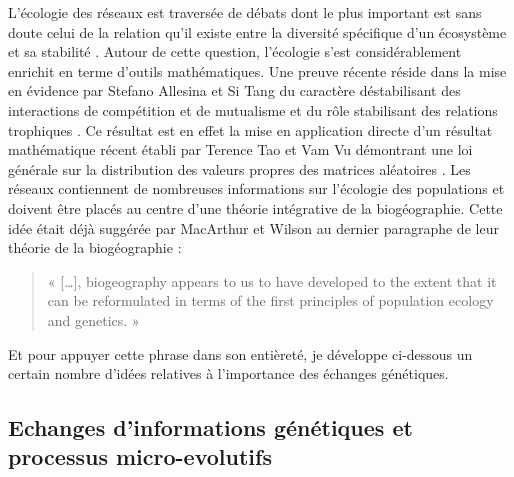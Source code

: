L'écologie des réseaux est traversée de débats dont le plus important
est sans doute celui de la relation qu'il existe entre la diversité
spécifique d'un écosystème et sa stabilité \citep{May1973, McCann2000}.
Autour de cette question, l'écologie s'est considérablement enrichit en
terme d'outils mathématiques. Une preuve récente réside dans la mise en
évidence par Stefano Allesina et Si Tang du caractère déstabilisant des
interactions de compétition et de mutualisme et du rôle stabilisant des
relations trophiques \citep{Allesina2012a}. Ce résultat est en effet la
mise en application directe d'un résultat mathématique récent établi par
Terence Tao et Vam Vu démontrant une loi générale sur la distribution
des valeurs propres des matrices aléatoires \citep{Tao2010}. Les réseaux
contiennent de nombreuses informations sur l'écologie des populations et
doivent être placés au centre d'une théorie intégrative de la
biogéographie. Cette idée était déjà suggérée par MacArthur et Wilson au
dernier paragraphe de leur théorie de la biogéographie
\citep{MacArthur1967} :

\begin{quote}
« {[}\ldots{}{]}, biogeography appears to us to have developed to the
extent that it can be reformulated in terms of the first principles of
population ecology and genetics. »
\end{quote}

Et pour appuyer cette phrase dans son entièreté, je développe ci-dessous
un certain nombre d'idées relatives à l'importance des échanges
génétiques.

\subsection*{Echanges d'informations génétiques et processus
micro-evolutifs}\label{echanges-dinformations-guxe9nuxe9tiques-et-processus-micro-evolutifs}

